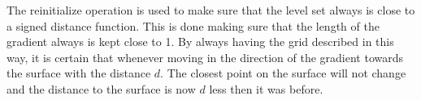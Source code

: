The reinitialize operation is used to make sure that the level set always is close to a signed distance function. 
This is done making sure that the length of the gradient always is kept close to 1. 
By always having the grid described in this way, it is certain that whenever moving in the direction of the gradient towards the surface with the distance $d$. 
The closest point on the surface will not change and the distance to the surface is now $d$ less then it was before.
